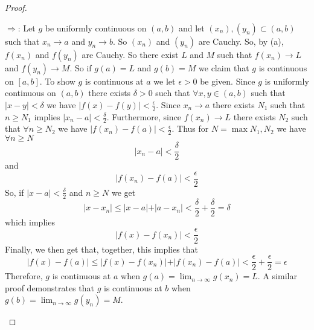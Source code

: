 \begin{enumerate}
\begin{proof}
\begin{enumerate}
        \( \Rightarrow \): Let \( g \) be uniformly continuous on \( (a,b) \) and let \( (x_{n}),(y_{n}) \subset (a,b) \) such that \( x_{n} \rightarrow a \) and \( y_{n} \rightarrow b \). So \( (x_{n}) \) and \( (y_{n}) \) are Cauchy. So, by (a), \(f(x_{n}) \) and \( f(y_{n}) \) are Cauchy. So there exist \( L \) and \( M \) such that \( f(x_{n}) \rightarrow L \) and \( f(y_{n}) \rightarrow M \). So if \( g(a) = L \) and \( g(b) = M \) we claim that \( g \) is continuous on \( [a,b] \). To show \( g \) is continuous at \( a \) we let \( \epsilon > 0 \) be given. Since \( g \) is uniformly continuous on \( (a,b) \) there exists \( \delta > 0 \) such that \( \forall x,y \in (a,b) \) such that \( \vert x-y \vert < \delta \) we have \( \vert f(x) - f(y) \vert < \frac{\epsilon}{2} \). Since \( x_{n} \rightarrow a \) there exists \( N_{1} \) such that \( n \geq N_{1} \) implies \( \vert x_{n} - a \vert < \frac{\delta}{2} \). Furthermore, since \( f(x_{n}) \rightarrow L \) there exists \( N_{2} \) such that \( \forall n \geq N_{2} \) we have \( \vert f(x_{n}) - f(a) \vert < \frac{\epsilon}{2} \). Thus for \( N = \max{N_{1},N_{2}} \) we have \( \forall n \geq N \) 
        \[
        \vert x_{n} - a \vert < \frac{\delta}{2}
        \]
        and
        \[
        \vert f(x_{n}) - f(a) \vert < \frac{\epsilon}{2}
        \]
        So, if \( \vert x - a \vert < \frac{\delta}{2} \) and \( n \geq N \) we get
        \[
        \vert x - x_{n} \vert \leq \vert x-a \vert + \vert a-x_{n} \vert < \frac{\delta}{2} + \frac{\delta}{2} = \delta
        \]
        which implies
        \[
        \vert f(x)-f(x_{n}) \vert < \frac{\epsilon}{2}
        \]
        Finally, we then get that, together, this implies that
        \[
        \vert f(x) - f(a) \vert \leq \vert f(x) - f(x_{n}) \vert + \vert f(x_{n}) - f(a) \vert < \frac{\epsilon}{2} + \frac{\epsilon}{2} = \epsilon
        \]
        Therefore, \( g \) is continuous at \( a \) when \( g(a) = \lim_{n \rightarrow \infty} g(x_{n}) = L \). A similar proof demonstrates that \( g \) is continuous at \( b \) when \( g(b) = \lim_{n \rightarrow \infty} g(y_{n}) = M \). 
    \end{enumerate}
    \end{proof}
    
    
    
\end{enumerate}